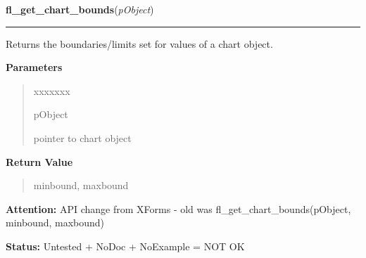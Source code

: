 \hspace{.8\funcindent}\begin{boxedminipage}{\funcwidth}

    \raggedright \textbf{fl\_get\_chart\_bounds}(\textit{pObject})

    \vspace{-1.5ex}

    \rule{\textwidth}{0.5\fboxrule}
\setlength{\parskip}{2ex}
    Returns the boundaries/limits set for values of a chart object.

\setlength{\parskip}{1ex}
      \textbf{Parameters}
      \vspace{-1ex}

      \begin{quote}
        \begin{Ventry}{xxxxxxx}

          \item[pObject]

          pointer to chart object

        \end{Ventry}

      \end{quote}

      \textbf{Return Value}
    \vspace{-1ex}

      \begin{quote}
      minbound, maxbound

      \end{quote}

\textbf{Attention:} API change from XForms - old was fl\_get\_chart\_bounds(pObject, minbound, 
maxbound)



\textbf{Status:} Untested + NoDoc + NoExample = NOT OK



    \end{boxedminipage}

    \label{xformslib:library:fl_set_chart_maxnumb}

    \vspace{0.5ex}

